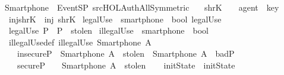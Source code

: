 %
\begin{isabellebody}%
  \isadelimtheory
  \isanewline
  \isanewline
  \endisadelimtheory
  \isatagtheory
  \isamarkupfalse%
  \ Smartphone\ \ {\isachardoublequoteopen}{\isachardot}{\isacharslash}EventSP{\isachardoublequoteclose}\ {\isachardoublequoteopen}{\isachartilde}{\isachartilde}{\isacharslash}src{\isacharslash}HOL{\isacharslash}Auth{\isacharslash}All{\isacharunderscore}Symmetric{\isachardoublequoteclose}\ %
  \endisatagtheory
  {\isafoldtheory}%
  \isadelimtheory
  \isanewline
  \endisadelimtheory
  \isanewline
  \isanewline
  \isamarkupfalse%
  \isanewline
  \ \ shrK\ \ {\isacharcolon}{\isacharcolon}\ \ {\isachardoublequoteopen}agent\ {\isasymRightarrow}\ key{\isachardoublequoteclose}\isanewline
  \isanewline
  \isanewline
  \ \ inj{\isacharunderscore}shrK\ {\isacharcolon}\ {\isachardoublequoteopen}inj\ shrK{\isachardoublequoteclose}\isanewline
  \isanewline
  \isanewline
  \isanewline
  \isamarkupfalse%
  \ legalUse\ {\isacharcolon}{\isacharcolon}\ {\isachardoublequoteopen}smartphone\ {\isasymRightarrow}\ bool{\isachardoublequoteclose}\ {\isacharparenleft}{\isachardoublequoteopen}legalUse\ {\isacharparenleft}{\isacharunderscore}{\isacharparenright}{\isachardoublequoteclose}{\isacharparenright}\ \isanewline
  \ \ {\isachardoublequoteopen}legalUse\ P\ {\isacharequal}{\isacharequal}\ P\ {\isasymnotin}\ stolen{\isachardoublequoteclose}\isanewline
  \isanewline
  \isanewline
  \isamarkupfalse%
  \ illegalUse\ {\isacharcolon}{\isacharcolon}\ {\isachardoublequoteopen}smartphone\ {\isasymRightarrow}\ bool{\isachardoublequoteclose}\ \isanewline
  \ \ illegalUse{\isacharunderscore}def{\isacharcolon}\ {\isachardoublequoteopen}illegalUse\ {\isacharparenleft}Smartphone\ A{\isacharparenright}\ {\isacharequal}\ {\isacharparenleft}\isanewline
  \ \ \ \ {\isacharparenleft}insecureP\ {\isasymand}\ {\isacharparenleft}Smartphone\ A\ {\isasymin}\ stolen{\isacharparenright}\ {\isasymor}\ {\isacharparenleft}Smartphone\ A\ {\isasymin}\ badP{\isacharparenright}{\isacharparenright}\ {\isasymor}\isanewline
  \ \ \ \ {\isacharparenleft}secureP\ \ \ {\isasymand}\ {\isacharparenleft}Smartphone\ A\ {\isasymin}\ stolen{\isacharparenright}{\isacharparenright}{\isacharparenright}{\isachardoublequoteclose}\isanewline
  \ \ \isanewline
  \isanewline
  \isamarkupfalse%
  \ initState\ {\isasymequiv}\ initState\isanewline

\end{isabellebody}
